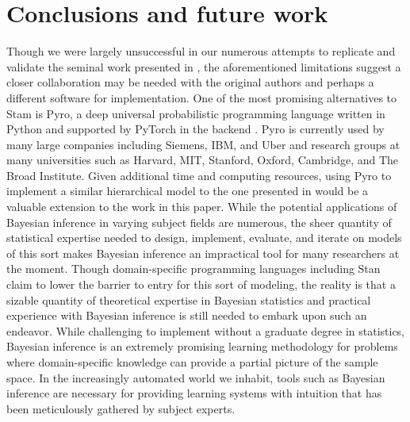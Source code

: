\documentclass[
  12pt,
  oneside]{book}
\theoremstyle{definition}
\theoremstyle{definition}
\theoremstyle{definition}
\theoremstyle{remark}
\begin{document}
\hypertarget{conclusions-and-future-work}{%
\chapter*{Conclusions and future work}\label{conclusions-and-future-work}}

Though we were largely unsuccessful in our numerous attempts to replicate and validate the seminal work presented in \citet{Kotta2019}, the aforementioned limitations suggest a closer collaboration may be needed with the original authors and perhaps a different software for implementation.
One of the most promising alternatives to Stam is Pyro, a deep universal probabilistic programming language written in Python and supported by PyTorch in the backend \citep[\citet{phan2019composable}]{bingham2018pyro}.
Pyro is currently used by many large companies including Siemens, IBM, and Uber and research groups at many universities such as Harvard, MIT, Stanford, Oxford, Cambridge, and The Broad Institute.
Given additional time and computing resources, using Pyro to implement a similar hierarchical model to the one presented in \citet{Kotta2019} would be a valuable extension to the work in this paper.
While the potential applications of Bayesian inference in varying subject fields are numerous, the sheer quantity of statistical expertise needed to design, implement, evaluate, and iterate on models of this sort makes Bayesian inference an impractical tool for many researchers at the moment.
Though domain-specific programming languages including Stan claim to lower the barrier to entry for this sort of modeling, the reality is that a sizable quantity of theoretical expertise in Bayesian statistics and practical experience with Bayesian inference is still needed to embark upon such an endeavor.
While challenging to implement without a graduate degree in statistics, Bayesian inference is an extremely promising learning methodology for problems where domain-specific knowledge can provide a partial picture of the sample space.
In the increasingly automated world we inhabit, tools such as Bayesian inference are necessary for providing learning systems with intuition that has been meticulously gathered by subject experts.

  
\end{document}
